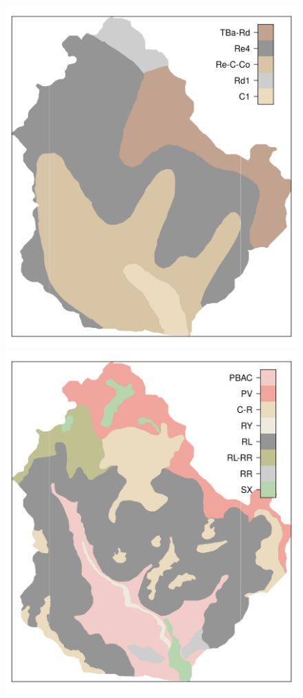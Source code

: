 \begin{figure}[!ht]
\centering
\begin{minipage}[b]{0.45\textwidth}
\subcaption{}
\centering
\includegraphics[width = \textwidth]{fig/chap05-soil-old}
\end{minipage}
\begin{minipage}[b]{0.45\textwidth}
\subcaption{}
\centering
\includegraphics[width = \textwidth]{fig/chap05-soil-new}

\end{minipage}
\end{figure}
